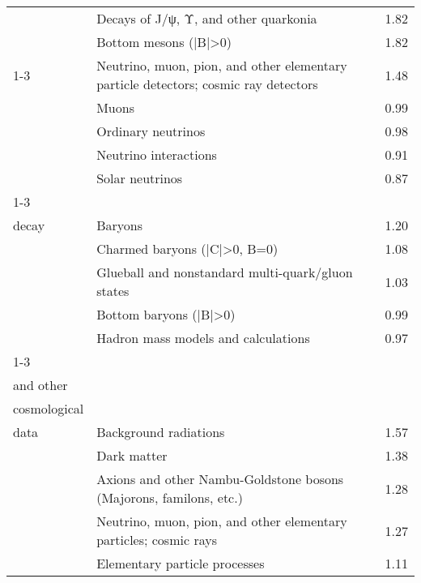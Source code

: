 \begin{longtable}[H]{p{}|p{}|p{}}
                                        & Decays of J/ψ, Υ, and other quarkonia &  1.82 \\
                                        & Bottom mesons (|B|>0) &  1.82 \\
\cline{1-3}
\multirow{5}{*}{\begin{tabular}{l}Detectors\end{tabular}} & Neutrino, muon, pion, and other elementary particle detectors; cosmic ray detectors &  1.48 \\
                                        & Muons &  0.99 \\
                                        & Ordinary neutrinos &  0.98 \\
                                        & Neutrino interactions &  0.91 \\
                                        & Solar neutrinos &  0.87 \\
\cline{1-3}
\multirow{5}{*}{\begin{tabular}{l}Double-beta\\ decay\end{tabular}} & Baryons &  1.20 \\
                                        & Charmed baryons (|C|>0, B=0) &  1.08 \\
                                        & Glueball and nonstandard multi-quark/gluon states &  1.03 \\
                                        & Bottom baryons (|B|>0) &  0.99 \\
                                        & Hadron mass models and calculations &  0.97 \\
\cline{1-3}
\multirow{5}{*}{\begin{tabular}{l}Early-universe\\ and other\\ cosmological\\ data\end{tabular}} & Background radiations &  1.57 \\
                                        & Dark matter &  1.38 \\
                                        & Axions and other Nambu-Goldstone bosons (Majorons, familons, etc.) &  1.28 \\
                                        & Neutrino, muon, pion, and other elementary particles; cosmic rays &  1.27 \\
                                        & Elementary particle processes &  1.11 \\

\end{longtable}
